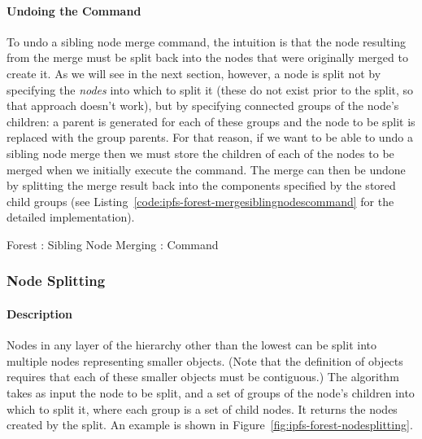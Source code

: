 \paragraph{Undoing the Command}

To undo a sibling node merge command, the intuition is that the node resulting from the merge must be split back into the nodes that were originally merged to create it. As we will see in the next section, however, a node is split not by specifying the \emph{nodes} into which to split it (these do not exist prior to the split, so that approach doesn't work), but by specifying connected groups of the node's children: a parent is generated for each of these groups and the node to be split is replaced with the group parents. For that reason, if we want to be able to undo a sibling node merge then we must store the children of each of the nodes to be merged when we initially execute the command. The merge can then be undone by splitting the merge result back into the components specified by the stored child groups (see Listing~\ref{code:ipfs-forest-mergesiblingnodescommand} for the detailed implementation).

\begin{stulisting}[p]
\caption{Forest : Sibling Node Merging : Command}
\label{code:ipfs-forest-mergesiblingnodescommand}

\end{stulisting}

\afterpage{\clearpage}
\newpage

\subsubsection{Node Splitting}

\paragraph{Description}

Nodes in any layer of the hierarchy other than the lowest can be split into multiple nodes representing smaller objects. (Note that the definition of objects requires that each of these smaller objects must be contiguous.) The algorithm takes as input the node to be split, and a set of groups of the node's children into which to split it, where each group is a set of child nodes. It returns the nodes created by the split. An example is shown in Figure~\ref{fig:ipfs-forest-nodesplitting}.

